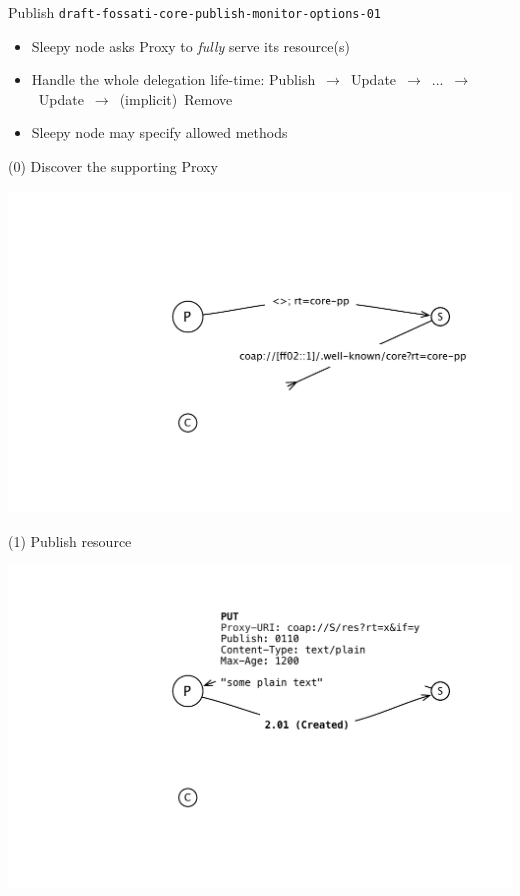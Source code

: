 \documentclass{beamer}
\begin{document}
\begin{frame}{Publish \hspace{5cm} {\tiny \texttt{draft-fossati-core-publish-monitor-options-01}}}

\begin{itemize}
 \item Sleepy node asks Proxy to \emph{fully} serve its resource(s)
 \item Handle the whole delegation life-time: \mbox{\small{Publish $\rightarrow$ Update $\rightarrow$ ... $\rightarrow$ Update $\rightarrow$ (implicit) Remove}}
 \item Sleepy node may specify allowed methods %
\end{itemize}

\end{frame}

\begin{frame}{(0) Discover the supporting Proxy}
 \begin{center}
  \includegraphics[width=\textwidth]{../../share/images/publish-1.pdf}
 \end{center}
\end{frame}


\begin{frame}{(1) Publish resource}
 \begin{center}
  \includegraphics[width=\textwidth]{../../share/images/publish0.pdf}
 \end{center}
\end{frame}
\end{document}
